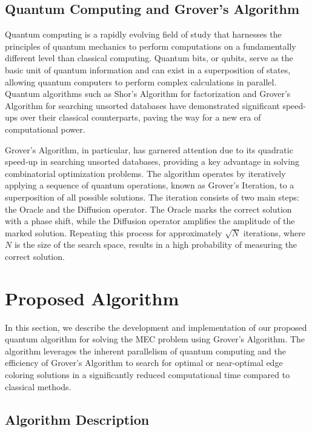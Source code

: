 \subsection{Quantum Computing and Grover's Algorithm}\label{subsec:quantum}

Quantum computing is a rapidly evolving field of study that harnesses the principles of quantum mechanics to perform computations on a fundamentally different level than classical computing. Quantum bits, or qubits, serve as the basic unit of quantum information and can exist in a superposition of states, allowing quantum computers to perform complex calculations in parallel. Quantum algorithms such as Shor's Algorithm for factorization \cite{Shor1994} and Grover's Algorithm for searching unsorted databases \cite{Grover1996} have demonstrated significant speed-ups over their classical counterparts, paving the way for a new era of computational power.

Grover's Algorithm, in particular, has garnered attention due to its quadratic speed-up in searching unsorted databases, providing a key advantage in solving combinatorial optimization problems. The algorithm operates by iteratively applying a sequence of quantum operations, known as Grover's Iteration, to a superposition of all possible solutions. The iteration consists of two main steps: the Oracle and the Diffusion operator. The Oracle marks the correct solution with a phase shift, while the Diffusion operator amplifies the amplitude of the marked solution. Repeating this process for approximately $\sqrt{N}$ iterations, where $N$ is the size of the search space, results in a high probability of measuring the correct solution.

\section{Proposed Algorithm}\label{sec:algorithm}

In this section, we describe the development and implementation of our proposed quantum algorithm for solving the MEC problem using Grover's Algorithm. The algorithm leverages the inherent parallelism of quantum computing and the efficiency of Grover's Algorithm to search for optimal or near-optimal edge coloring solutions in a significantly reduced computational time compared to classical methods.

\subsection{Algorithm Description}\label{subsec:description}

